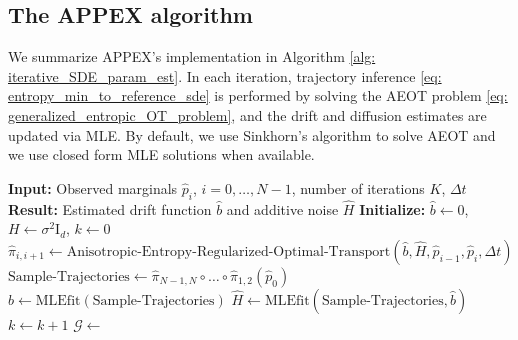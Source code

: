 \documentclass[twoside,11pt]{article}
\newcommand{\Id}{\mathrm{I}_d}
\begin{document}
\subsection{The APPEX algorithm}
We summarize APPEX's implementation in Algorithm \ref{alg: iterative_SDE_param_est}. In each iteration, trajectory inference \eqref{eq: entropy_min_to_reference_sde} is performed by solving the AEOT problem \eqref{eq: generalized_entropic_OT_problem}, and the drift and diffusion estimates are updated via MLE. By default, we use Sinkhorn's algorithm to solve AEOT and we use closed form MLE solutions when available.
\begin{algorithm}
\caption{Parameter estimation for an additive noise SDE from temporal marginals with APPEX}
\begin{algorithmic}[1]
\State \textbf{Input:} Observed marginals $\hat{p}_i$, $i = 0, \ldots, N-1$, number of iterations $K$, $\Delta t$
\State \textbf{Result:} Estimated drift function $\hat{b}$ and additive noise $\hat{H}$
\State \textbf{Initialize:} $\hat{b} \gets 0$, $H \gets \sigma^2 \Id$, $k \gets 0$
        \State $\hat{\pi}_{i, i+1} \gets \text{Anisotropic-Entropy-Regularized-Optimal-Transport}(\hat{b}, \hat{H}, \hat{p}_{i-1}, \hat{p}_i, \Delta t)$
    \EndFor
    \State $\text{Sample-Trajectories} \gets \hat{\pi}_{N-1, N} \circ \ldots \circ \hat{\pi}_{1, 2}(\hat{p}_0)$
    \State $\hat{b} \gets \text{MLEfit}(\text{Sample-Trajectories})$
    \State $\hat{H} \gets \text{MLEfit}(\text{Sample-Trajectories}, \hat{b})$
    \State $k \gets k + 1$
\EndWhile
\State $\mathcal{G} \gets$ 
\end{algorithmic}
\label{alg: iterative_SDE_param_est}
\end{algorithm}
\end{document}
